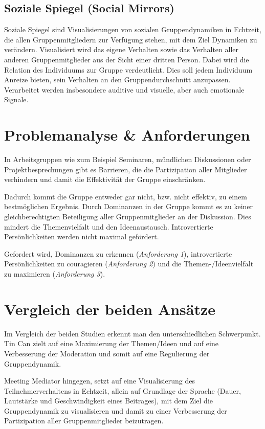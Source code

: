 \documentclass{seminarvorlage}
\begin{document}
\subsection{Soziale Spiegel (Social Mirrors)}
Soziale Spiegel \cite{BergKara2009-2} sind Visualisierungen von sozialen
Gruppendynamiken in Echtzeit, die allen Gruppenmitgliedern zur Verfügung stehen,
mit dem Ziel Dynamiken zu ver\-änd\-ern. Visualisiert wird das eigene Verhalten
sowie das Verhalten aller anderen Gruppenmitglieder aus der Sicht einer dritten
Person. Dabei wird die Relation des Individuums zur Gruppe verdeutlicht. Dies
soll jedem Individuum Anreize bieten, sein Verhalten an den Gruppendurchschnitt
anzupassen. Verarbeitet werden insbesondere auditive und visuelle, aber
auch emotionale Signale.

\section{Problemanalyse \& Anforderungen}
In Arbeitsgruppen wie zum Beispiel Seminaren, münd\-lich\-en Diskussionen oder
Projektbesprechungen gibt es Barrieren, die die Partizipation aller
Mitglieder verhindern und damit die Effektivität der Gruppe einschränken.

Dadurch kommt die Gruppe entweder gar nicht, bzw. nicht effektiv, zu einem
best\-mög\-lich\-en Ergebnis. Durch Dominanzen in der Gruppe kommt es zu
keiner gleichberechtigten Beteiligung aller Gruppenmitglieder an der Diskussion.
Dies mindert die Themenvielfalt und den Ideenaustausch. Introvertierte
Per\-sön\-lich\-keit\-en werden nicht maximal gefördert.

Gefordert wird, Dominanzen zu erkennen ({\em Anforderung 1}), introvertierte Per\-sön\-lich\-keit\-en
zu couragieren ({\em Anforderung 2}) und die Themen-/\-Ideen\-vielfalt zu maximieren ({\em Anforderung 3}).




\section{Vergleich der beiden Ansätze}
Im Vergleich der beiden Studien erkennt man den unterschiedlichen Schwerpunkt.
Tin Can \cite{HarGorSch2012} zielt auf eine Maximierung der Themen/Ideen und auf
eine Verbesserung der Moderation und somit auf eine Regulierung der Gruppendynamik.

Meeting Mediator \cite{KimChaHolPent2008} hingegen, setzt auf eine
Visualisierung des Teilnehmerverhaltens in Echtzeit, allein auf Grundlage der Sprache (Dauer,
Lautstärke und Geschwindigkeit eines Beitrages), mit dem Ziel die Gruppendynamik zu
visualisieren und damit zu einer Verbesserung der Partizipation aller
Gruppenmitglieder beizutragen.
\end{document}
